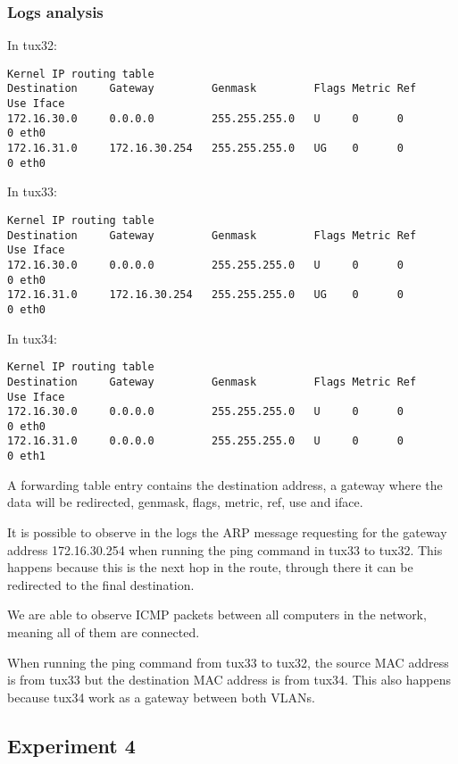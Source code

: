 \documentclass[a4paper, 11pt]{report}
\begin{document}
\subsubsection{Logs analysis} \label{sec:Log3}

In tux32:
\begin{lstlisting}[frame=tb, numbers=none]
Kernel IP routing table
Destination     Gateway         Genmask         Flags Metric Ref    Use Iface
172.16.30.0     0.0.0.0         255.255.255.0   U     0      0        0 eth0
172.16.31.0     172.16.30.254   255.255.255.0   UG    0      0        0 eth0
\end{lstlisting}
In tux33:
\begin{lstlisting}[frame=tb, numbers=none]
Kernel IP routing table
Destination     Gateway         Genmask         Flags Metric Ref    Use Iface
172.16.30.0     0.0.0.0         255.255.255.0   U     0      0        0 eth0
172.16.31.0     172.16.30.254   255.255.255.0   UG    0      0        0 eth0
\end{lstlisting}
In tux34:
\begin{lstlisting}[frame=tb, numbers=none]
Kernel IP routing table
Destination     Gateway         Genmask         Flags Metric Ref    Use Iface
172.16.30.0     0.0.0.0         255.255.255.0   U     0      0        0 eth0
172.16.31.0     0.0.0.0         255.255.255.0   U     0      0        0 eth1
\end{lstlisting}

A forwarding table entry contains the destination address, a gateway where the data will be redirected, genmask, flags, metric, ref, use and iface.

It is possible to observe in the logs the ARP message requesting for the gateway address 172.16.30.254 when running the ping command in tux33 to tux32.
This happens because this is the next hop in the route, through there it can be redirected to the final destination.

We are able to observe ICMP packets between all computers in the network, meaning all of them are connected.

When running the ping command from tux33 to tux32, the source MAC address is from tux33 but the destination MAC address is from tux34. This also happens because tux34
work as a gateway between both VLANs.

\subsection{Experiment 4} \label{sec:Exp4}
\end{document}
